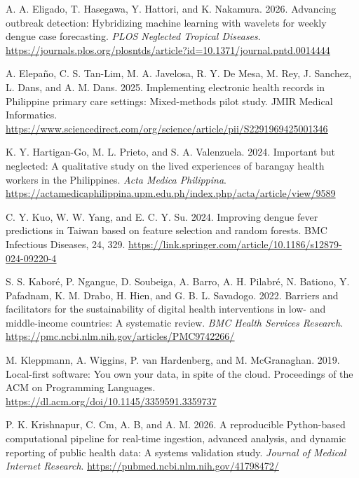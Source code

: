\documentclass[
]{article}
\begin{document}
A. A. Eligado, T. Hasegawa, Y. Hattori, and K. Nakamura. 2026. Advancing
outbreak detection: Hybridizing machine learning with wavelets for
weekly dengue case forecasting. \emph{PLOS Neglected Tropical Diseases}.
\href{https://journals.plos.org/plosntds/article?id=10.1371/journal.pntd.0014444}{\ul{https://journals.plos.org/plosntds/article?id=10.1371/journal.pntd.0014444}}

A. Elepaño, C. S. Tan-Lim, M. A. Javelosa, R. Y. De Mesa, M. Rey, J.
Sanchez, L. Dans, and A. M. Dans. 2025. Implementing electronic health
records in Philippine primary care settings: Mixed-methods pilot study.
JMIR Medical Informatics.\\
\href{https://www.sciencedirect.com/org/science/article/pii/S2291969425001346}{\ul{https://www.sciencedirect.com/org/science/article/pii/S2291969425001346}}

K. Y. Hartigan-Go, M. L. Prieto, and S. A. Valenzuela. 2024. Important
but neglected: A qualitative study on the lived experiences of barangay
health workers in the Philippines. \emph{Acta Medica Philippina}.
\href{https://actamedicaphilippina.upm.edu.ph/index.php/acta/article/view/9589}{\ul{https://actamedicaphilippina.upm.edu.ph/index.php/acta/article/view/9589}}

C. Y. Kuo, W. W. Yang, and E. C. Y. Su. 2024. Improving dengue fever
predictions in Taiwan based on feature selection and random forests. BMC
Infectious Diseases, 24, 329.
\href{https://link.springer.com/article/10.1186/s12879-024-09220-4}{\ul{https://link.springer.com/article/10.1186/s12879-024-09220-4}}

S. S. Kaboré, P. Ngangue, D. Soubeiga, A. Barro, A. H. Pilabré, N.
Bationo, Y. Pafadnam, K. M. Drabo, H. Hien, and G. B. L. Savadogo. 2022.
Barriers and facilitators for the sustainability of digital health
interventions in low- and middle-income countries: A systematic review.
\emph{BMC Health Services Research}.
\href{https://pmc.ncbi.nlm.nih.gov/articles/PMC9742266/}{\ul{https://pmc.ncbi.nlm.nih.gov/articles/PMC9742266/}}

M. Kleppmann, A. Wiggins, P. van Hardenberg, and M. McGranaghan. 2019.
Local-first software: You own your data, in spite of the cloud.
Proceedings of the ACM on Programming Languages.
\href{https://dl.acm.org/doi/10.1145/3359591.3359737}{\ul{https://dl.acm.org/doi/10.1145/3359591.3359737}}

P. K. Krishnapur, C. Cm, A. B, and A. M. 2026. A reproducible
Python-based computational pipeline for real-time ingestion, advanced
analysis, and dynamic reporting of public health data: A systems
validation study. \emph{Journal of Medical Internet Research}.
\href{https://pubmed.ncbi.nlm.nih.gov/41798472/}{\ul{https://pubmed.ncbi.nlm.nih.gov/41798472/}}
\end{document}
